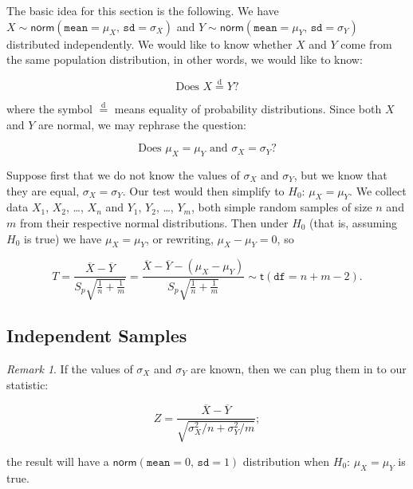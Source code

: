 \documentclass[]{book}
\numberwithin{equation}{chapter}
\numberwithin{figure}{chapter}
\theoremstyle{plain}
\theoremstyle{definition}
\theoremstyle{remark}
\theoremstyle{definition}
\theoremstyle{definition}
\theoremstyle{remark}
\newtheorem*{remark}{Remark}
\begin{document}
The basic idea for this section is the following. We have
\(X\sim\mathsf{norm}(\mathtt{mean} = \mu_{X},\,\mathtt{sd} = \sigma_{X})\)
and
\(Y\sim\mathsf{norm}(\mathtt{mean} = \mu_{Y},\,\mathtt{sd} = \sigma_{Y})\)
distributed independently. We would like to know whether \(X\) and \(Y\)
come from the same population distribution, in other words, we would
like to know:

\begin{equation}
\mbox{Does }X\overset{\mathrm{d}}{=}Y?
\end{equation}

where the symbol \(\overset{\mathrm{d}}{=}\) means equality of
probability distributions. Since both \(X\) and \(Y\) are normal, we may
rephrase the question:

\begin{equation}
\mbox{Does }\mu_{X} = \mu_{Y}\mbox{ and }\sigma_{X} = \sigma_{Y}?
\end{equation}

Suppose first that we do not know the values of \(\sigma_{X}\) and
\(\sigma_{Y}\), but we know that they are equal,
\(\sigma_{X}=\sigma_{Y}\). Our test would then simplify to
\(H_{0}:\,\mu_{X} = \mu_{Y}\). We collect data \(X_{1}\), \(X_{2}\),
\ldots{}, \(X_{n}\) and \(Y_{1}\), \(Y_{2}\), \ldots{}, \(Y_{m}\), both
simple random samples of size \(n\) and \(m\) from their respective
normal distributions. Then under \(H_{0}\) (that is, assuming \(H_{0}\)
is true) we have \(\mu_{X} = \mu_{Y}\), or rewriting,
\(\mu_{X} - \mu_{Y} = 0\), so

\begin{equation}
T = \frac{\overline{X} - \overline{Y}}{S_{p}\sqrt{\frac{1}{n} + \frac{1}{m}}} = \frac{\overline{X} - \overline{Y} - (\mu_{X} - \mu_{Y})}{S_{p}\sqrt{\frac{1}{n} + \frac{1}{m}}}\sim\mathsf{t}(\mathtt{df} = n + m - 2).
\end{equation}

\subsection{Independent Samples}\label{independent-samples}

\begin{remark}
If the values of \(\sigma_{X}\) and \(\sigma_{Y}\) are known, then we
can plug them in to our statistic:

\begin{equation} 
Z = \frac{\overline{X} - \overline{Y}}{\sqrt{\sigma_{X}^{2}/n + \sigma_{Y}^{2}/m}};
\end{equation}

the result will have a
\(\mathsf{norm}(\mathtt{mean} = 0,\,\mathtt{sd} = 1)\) distribution when
\(H_{0}:\,\mu_{X} = \mu_{Y}\) is true.
\end{remark}
\end{document}
